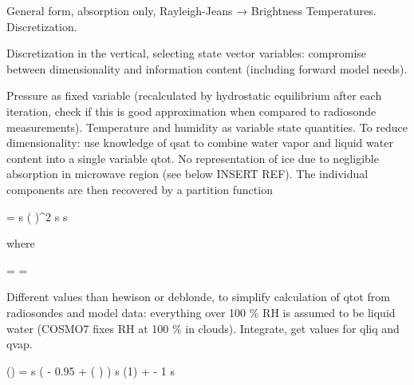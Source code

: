 \startsection[title=The Radiative Transfer Equation]

    General form, absorption only, Rayleigh-Jeans → Brightness Temperatures.
    Discretization.

\stopsection


\startsection[title=Representation of the Atmospheric State]

    Discretization in the vertical, selecting state vector variables:
    compromise between dimensionality and information content (including
    forward model needs).

    \startsubsection[title=The Choice of State Vector Variables]

        Pressure as fixed variable (recalculated by hydrostatic equilibrium
        after each iteration, check if this is good approximation when compared
        to radiosonde measurements). Temperature and humidity as variable
        state quantities. To reduce dimensionality: use knowledge of qsat to
        combine water vapor and liquid water content into a single variable
        qtot. No representation of ice due to negligible absorption in
        microwave region (see below INSERT REF). The individual components are
        then recovered by a partition function

        \startformula
            \DERIV{\QLIQ}{\RHL} =  \startcases
                 \MC s  \NR
                \NC \cos \left(   \right)^2
                     \le s  \EQCOMMA\NR
                  \le s \NR
            \stopcases
        \stopformula

        where

        \startformula
            \RHL = \frac{\QTOT}{\QSAT} = \frac{\QVAP + \QLIQ}{\QSAT} \EQSTOP
        \stopformula

        Different values than hewison or deblonde, to simplify calculation
        of qtot from radiosondes and model data: everything over 100 \% RH
        is assumed to be liquid water (COSMO7 fixes RH at 100 \% in clouds).
        Integrate, get values for qliq and qvap.

        \startformula
            \QLIQ(\RHL) = \QSAT \startcases
                 \MC s  \NR
                \NC {} \left( \RHL - 0.95 + 
                    \sin \left(  \right) \right)
                     \le s  \NR
                \NC \QLIQ(1) + \RHL - 1  \le s \NR
            \stopcases
        \stopformula

